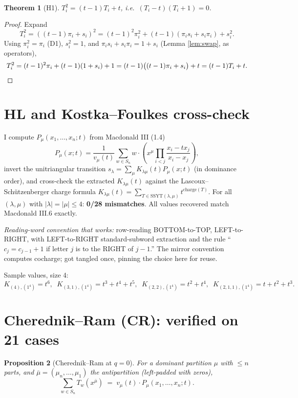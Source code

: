 \documentclass[11pt]{article}
\newtheorem{theorem}{Theorem}
\newtheorem{proposition}[theorem]{Proposition}
\begin{document}
\begin{theorem}[H1]
$T_i^2 = (t-1) T_i + t$, i.e.\ $(T_i - t)(T_i + 1) = 0$.
\end{theorem}
\begin{proof}
Expand
\[
T_i^2 = ((t-1)\pi_i + s_i)^2
      = (t-1)^2 \pi_i^2 + (t-1)(\pi_i s_i + s_i \pi_i) + s_i^2.
\]
Using $\pi_i^2 = \pi_i$ (D1), $s_i^2 = 1$, and
$\pi_i s_i + s_i \pi_i = 1 + s_i$ (Lemma \ref{lem:swap}, as operators),
\[
T_i^2 = (t-1)^2 \pi_i + (t-1)(1 + s_i) + 1
      = (t-1)\bigl((t-1)\pi_i + s_i\bigr) + t
      = (t-1) T_i + t. \qedhere
\]
\end{proof}

\section{HL and Kostka--Foulkes cross-check}

I compute $P_\mu(x_1, \ldots, x_n; t)$ from Macdonald III (1.4)
\[
P_\mu(x; t) = \frac{1}{v_\mu(t)} \sum_{w \in S_n}
     w \cdot \left( x^\mu \prod_{i<j} \frac{x_i - t x_j}{x_i - x_j} \right),
\]
invert the unitriangular transition $s_\lambda = \sum_\mu K_{\lambda\mu}(t)
P_\mu(x; t)$ (in dominance order), and cross-check the extracted
$K_{\lambda\mu}(t)$ against the Lascoux--Schützenberger charge formula
$K_{\lambda\mu}(t) = \sum_{T \in \mathrm{SSYT}(\lambda, \mu)} t^{\mathrm{charge}(T)}$.
For all $(\lambda, \mu)$ with $|\lambda| = |\mu| \leq 4$: \textbf{0/28
mismatches}. All values recovered match Macdonald III.6 exactly.

\emph{Reading-word convention that works:} row-reading
BOTTOM-to-TOP, LEFT-to-RIGHT, with LEFT-to-RIGHT standard-subword extraction
and the rule ``$c_j = c_{j-1} + 1$ if letter $j$ is to the RIGHT of $j-1$.''
The mirror convention computes cocharge; got tangled once, pinning the choice
here for reuse.

Sample values, size 4:
\[
K_{(4),(1^4)} = t^6, \;\;
K_{(3,1),(1^4)} = t^3 + t^4 + t^5, \;\;
K_{(2,2),(1^4)} = t^2 + t^4, \;\;
K_{(2,1,1),(1^4)} = t + t^2 + t^3.
\]

\section{Cherednik--Ram (CR): verified on 21 cases}

\begin{proposition}[Cherednik--Ram at $q=0$]
For a dominant partition $\mu$ with $\leq n$ parts, and $\bar\mu =
(\mu_n, \ldots, \mu_1)$ the antipartition (left-padded with zeros),
\[
\sum_{w \in S_n} T_w(x^{\bar\mu}) \;=\; v_\mu(t) \cdot P_\mu(x_1, \ldots, x_n; t).
\]
\end{proposition}
\end{document}
